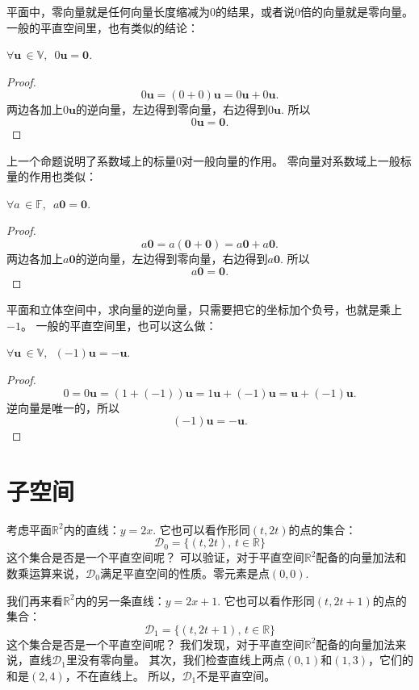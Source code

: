 \documentclass[12pt,UTF8,fontset=none]{ctexbook}
\begin{document}
平面中，零向量就是任何向量长度缩减为0的结果，或者说0倍的向量就是零向量。
一般的平直空间里，也有类似的结论：
\begin{pp}\label{pp:1_3}
    $\forall \mathbf{u} \, \in \mathbb{V}, \,\,\, 0 \mathbf{u} = \mathbf{0}.$
\end{pp} 
\begin{proof} %
    $$ 0\mathbf{u} = (0 + 0)\mathbf{u} = 0\mathbf{u} + 0\mathbf{u}.$$
    两边各加上$0\mathbf{u}$的逆向量，左边得到零向量，右边得到$0\mathbf{u}$. 所以
    $$ 0\mathbf{u} = \mathbf{0}.$$
\end{proof}
 

上一个命题说明了系数域上的标量0对一般向量的作用。
零向量对系数域上一般标量的作用也类似：
\begin{pp}\label{pp:1_4}
    $\forall a \, \in \mathbb{F}, \,\,\, a \mathbf{0} = \mathbf{0}.$
\end{pp} 
\begin{proof} %
    $$ a\mathbf{0} = a(\mathbf{0}+\mathbf{0}) = a\mathbf{0}+a\mathbf{0}.$$
    两边各加上$a\mathbf{0}$的逆向量，左边得到零向量，右边得到$a\mathbf{0}$. 所以
    $$ a\mathbf{0} = \mathbf{0}.$$
\end{proof}
  

平面和立体空间中，求向量的逆向量，只需要把它的坐标加个负号，也就是乘上$-1$。
一般的平直空间里，也可以这么做：
\begin{pp}\label{pp:1_5}
    $\forall \mathbf{u} \, \in \mathbb{V}, \,\,\, (-1) \mathbf{u} = -\mathbf{u}.$
\end{pp} 
\begin{proof} %
    $$ 0 = 0\mathbf{u} = (1 + (-1))\mathbf{u} = 1\mathbf{u} + (-1)\mathbf{u} = \mathbf{u} + (-1)\mathbf{u}.$$
    逆向量是唯一的，所以
    $$ (-1)\mathbf{u} = -\mathbf{u}.$$
\end{proof}
 

\section{子空间}
考虑平面$\mathbb{R}^2$内的直线：$y = 2x.$ 它也可以看作形同$(t, 2t)$的点的集合：
$$ \mathcal{D}_0 = \{ (t, 2t), \, t \in \mathbb{R}\}$$
这个集合是否是一个平直空间呢？
可以验证，对于平直空间$\mathbb{R}^2$配备的向量加法和数乘运算来说，$\mathcal{D}_0$满足平直空间的性质。零元素是点$(0,0)$.

我们再来看$\mathbb{R}^2$内的另一条直线：$y = 2x + 1$. 它也可以看作形同$(t, 2t + 1)$的点的集合：
$$ \mathcal{D}_1 = \{ (t, 2t + 1), \, t \in \mathbb{R}\}$$
这个集合是否是一个平直空间呢？
我们发现，对于平直空间$\mathbb{R}^2$配备的向量加法来说，直线$\mathcal{D}_1$里没有零向量。
其次，我们检查直线上两点$(0,1)$和$(1,3)$，它们的和是$(2,4)$，不在直线上。
所以，$\mathcal{D}_1$不是平直空间。
\end{document}
